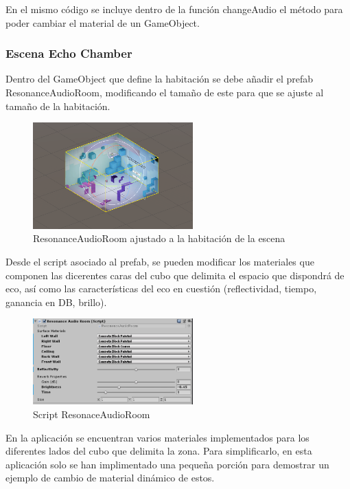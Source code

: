 \quad En el mismo código se incluye dentro de la función changeAudio el método para poder cambiar el material de un GameObject.\\

	\subsubsection{Escena Echo Chamber}
\quad Dentro del GameObject que define la habitación se debe añadir el prefab ResonanceAudioRoom, modificando el tamaño de este para que se ajuste al tamaño de la habitación.

\begin{figure}[htb]
	\centering
	\includegraphics[width=0.55\textwidth]{./imagenes/echoroom}
	\caption{ResonanceAudioRoom ajustado a la habitación de la escena}
\end{figure} 

\quad Desde el script asociado al prefab, se pueden modificar los materiales que componen las dicerentes caras del cubo que delimita el espacio que dispondrá de eco, así como las características del eco en cuestión (reflectividad, tiempo, ganancia en DB, brillo).

\begin{figure}[htb]
	\centering
	\includegraphics[width=0.55\textwidth]{./imagenes/audioroom}
	\caption{Script ResonaceAudioRoom}
\end{figure}


\quad En la aplicación se encuentran varios materiales implementados para los diferentes lados del cubo que delimita la zona. Para simplificarlo, en esta aplicación solo se han implimentado una pequeña porción para demostrar un ejemplo de cambio de material dinámico de estos.\\ 


